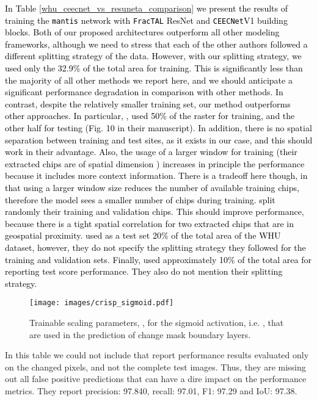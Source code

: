 \documentclass[times, 5p]{elsarticle}
\def \FracTAL {\texttt{FracTAL} }
\newcommand{\ceecnet}{\texttt{CEECNet}}
\newcommand{\mantis}{\texttt{mantis}}
\begin{document}
\textcolor{black}{
In Table \ref{whu_ceecnet_vs_resuneta_comparison} we present the results of training the \mantis{} network with \FracTAL ResNet and \ceecnet V1 building blocks. Both of our proposed architectures outperform all other modeling frameworks, although we need to stress that each of the other authors followed a different splitting strategy of the data. However, with our splitting strategy, we used only the 32.9\% of the total area for training. This is significantly less than the majority of all other methods we report here, and we should anticipate a significant performance degradation in comparison with other methods. In contrast, despite the relatively smaller training set, our method outperforms other approaches.} 
\textcolor{black}{
In particular, 
\cite{rs11111343}, used 50\% of the raster for training, and the other half for testing (Fig. 10 in their manuscript).   
In addition, there is no spatial separation between training and test sites, as it exists in our case, and this should work in their advantage. Also, the usage of a larger window for training (their extracted chips are of spatial dimension ) increases in principle the performance because it includes more context information. There is a tradeoff here though, in that using a larger window size reduces the number of available training chips, therefore the model sees a smaller number of chips during training. 
\cite{chen2020dasnet} split randomly their training and validation chips. This should improve performance, because there is a tight spatial correlation for two extracted chips that are in geospatial proximity.   \cite{Cao_2020} used as a test set  20\% of the total area of the WHU dataset, however, they do not specify the splitting strategy they followed for the training and validation sets. Finally, \cite{liu2019building} used approximately  10\% of the total area for reporting test score performance. They also do not mention their splitting strategy. 
}


\begin{figure}
\centering
\texttt{[image: images/crisp\_sigmoid.pdf]}
\caption{Trainable scaling parameters, , for the sigmoid activation, i.e. , that are used in the prediction of change mask boundary layers.} 
\label{ceecnet_crisp_sigmoid}
\end{figure}
In this table we could not include \cite[][PGA-SiamNet]{rs12030484} that report performance results evaluated only on the changed pixels, and not the complete test images. Thus, they are missing out all false positive predictions that can have a dire impact on the performance metrics. They report precision: 97.840, recall: 97.01,  F1: 97.29 and IoU: 97.38.  
\end{document}
